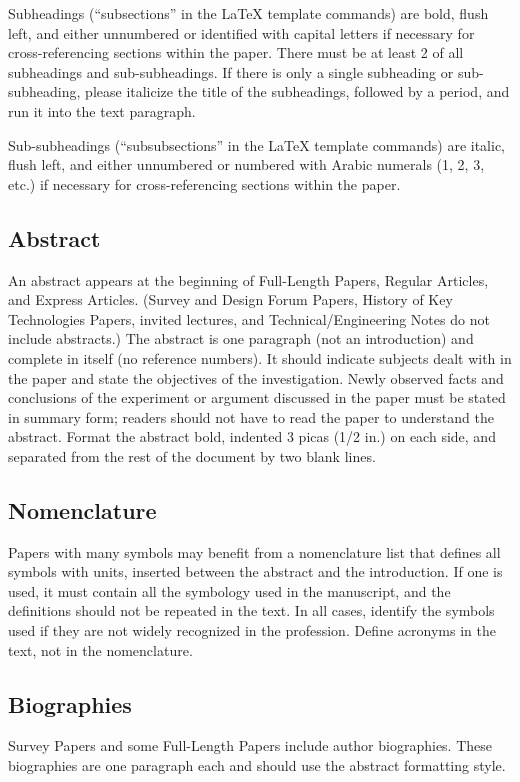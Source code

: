 \documentclass[journal ]{new-aiaa}
\begin{document}
Subheadings (``subsections'' in the \LaTeX{} template commands) are bold, flush left, and either unnumbered or identified with capital letters if necessary for cross-referencing sections within the paper. There must be at least 2 of all subheadings and sub-subheadings. If there is only a single subheading or sub-subheading, please italicize the title of the subheadings, followed by a period, and run it into the text paragraph. 

Sub-subheadings (``subsubsections'' in the \LaTeX{} template commands) are italic, flush left, and either unnumbered or numbered with Arabic numerals (1, 2, 3, etc.) if necessary for cross-referencing sections within the paper.


\subsection{Abstract}
An abstract appears at the beginning of Full-Length Papers, Regular Articles, and Express Articles. (Survey and Design Forum Papers, History of Key Technologies Papers, invited lectures, and Technical/Engineering Notes do not include abstracts.) The abstract is one paragraph (not an introduction) and complete in itself (no reference numbers). It should indicate subjects dealt with in the paper and state the objectives of the investigation. Newly observed facts and conclusions of the experiment or argument discussed in the paper must be stated in summary form; readers should not have to read the paper to understand the abstract. Format the abstract bold, indented 3 picas (1/2 in.) on each side, and separated from the rest of the document by two blank lines.


\subsection{Nomenclature}
Papers with many symbols may benefit from a nomenclature list that defines all symbols with units, inserted between the abstract and the introduction. If one is used, it must contain all the symbology used in the manuscript, and the definitions should not be repeated in the text. In all cases, identify the symbols used if they are not widely recognized in the profession. Define acronyms in the text, not in the nomenclature. 

\subsection{Biographies}
Survey Papers and some Full-Length Papers include author biographies. These biographies are one paragraph each and should use the abstract formatting style.
\end{document}
